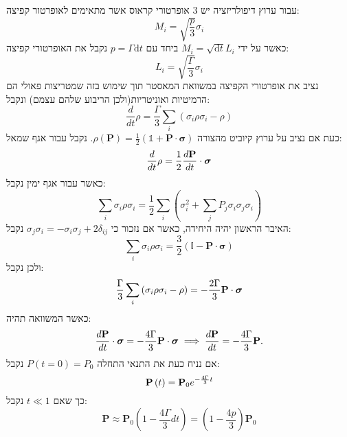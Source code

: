 \documentclass{tstextbook}
\begin{document}
\begin{example}
עבור ערוץ דיפולריזציה יש 3 אופרטורי קראוס אשר מתאימים לאופרטור קפיצה:
$$M_{i}=\sqrt{ \frac{p}{3} }\sigma_{i}$$
כאשר על ידי \(M_{i}=\sqrt{ \mathrm{d}t }L_{i}\) ביחד עם \(p=\Gamma \mathrm{d}t\) נקבל את האופרטורי קפיצה:
$$L_{i}=\sqrt{\frac{\Gamma}{3}}\sigma_{i}$$
נציב את אופרטורי הקפיצה במשוואת המאסטר תוך שימוש בזה שמטריצות פאולי הם הרמיטיות ואוניטריות(ולכן הריבוע שלהם עצמם) ונקבל:
$$\frac{d}{d t}\rho=\frac{\Gamma}{3}\sum_{i}\left(\sigma_{i}\rho\sigma_{i}-\rho\right)$$
כעת אם נציב על ערוץ קיוביט מהצורה \(\rho\left(\mathbf{P}\right)={\frac{1}{2}}\left(\mathbb{1}+\mathbf{P}\cdot\boldsymbol{\sigma}\right)\). נקבל עבור אגף שמאל:
$$\frac{d}{d t}\rho=\frac{1}{2}\frac{d{\bf P}}{d t}\cdot\boldsymbol{\sigma}$$
כאשר עבור אגף ימין נקבל:
$$\sum_{i}\sigma_{i}\rho\sigma_{i}=\frac{1}{2}\sum_{i}\left(\sigma_{i}^{2}+\sum_{j}P_{j}\sigma_{i}\sigma_{j}\sigma_{i}\right)$$
האיבר הראשון יהיה היחידה, כאשר אם נזכור כי \(\sigma_{j}\sigma_{i}=-\sigma_{i}\sigma_{j}+2\delta_{ij}\) נקבל:
$$\sum_{i}\sigma_{i}\rho\sigma_{i}=\frac{3}{2}\left(\mathbb{I}-\mathbf{P}\cdot\boldsymbol{\sigma}\right)$$
ולכן נקבל:
$$\frac{\Gamma}{3}\sum_{i}\left(\sigma_{i}\rho\sigma_{i}-\rho\right)=-\frac{2\Gamma}{3}{\bf P}\cdot\boldsymbol{\sigma}$$
כאשר המשוואה תהיה:
$${\frac{d\mathbf{P}}{d t}}\cdot\boldsymbol\sigma=-{\frac{4\Gamma}{3}}\mathbf{P}\cdot\boldsymbol\sigma\implies\frac{d{\bf P}}{d t}=-\frac{4{\Gamma}}{3}{\bf P}.$$
אם נניח כעת את התנאי התחלה \(P(t=0)=P_{0}\) נקבל:
$${\bf P}\left(t\right)={\bf P}_{0}e^{-\frac{4\Gamma}{3}t}$$
כך שאם \(t\ll 1\) נקבל:
$$\mathbf{P}\approx\mathbf{P}_{0}\left(1-{\frac{4\Gamma}{3}}d t\right)=\left(1-{\frac{4p}{3}}\right)\mathbf{P}_{0}$$

\end{example}
\end{document}
